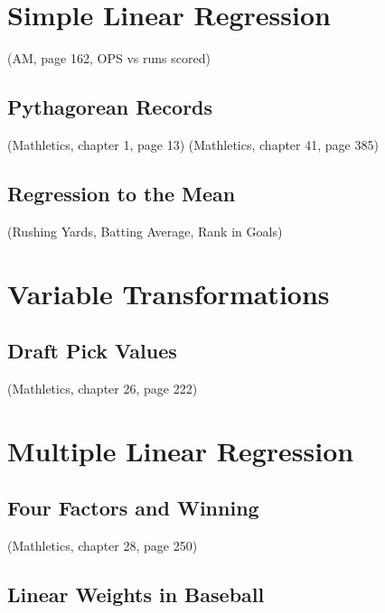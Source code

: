 \documentclass[
  11pt,
]{book}
\theoremstyle{definition}
\theoremstyle{definition}
\theoremstyle{definition}
\theoremstyle{definition}
\theoremstyle{remark}
\begin{document}
\hypertarget{simple-linear-regression}{%
\section{Simple Linear Regression}\label{simple-linear-regression}}

(AM, page 162, OPS vs runs scored)

\hypertarget{pythagorean-records}{%
\subsection{Pythagorean Records}\label{pythagorean-records}}

(Mathletics, chapter 1, page 13)
(Mathletics, chapter 41, page 385)

\hypertarget{regression-to-the-mean}{%
\subsection{Regression to the Mean}\label{regression-to-the-mean}}

(Rushing Yards, Batting Average, Rank in Goals)

\hypertarget{variable-transformations}{%
\section{Variable Transformations}\label{variable-transformations}}

\hypertarget{draft-pick-values}{%
\subsection{Draft Pick Values}\label{draft-pick-values}}

(Mathletics, chapter 26, page 222)

\hypertarget{multiple-linear-regression}{%
\section{Multiple Linear Regression}\label{multiple-linear-regression}}

\hypertarget{four-factors-and-winning}{%
\subsection{Four Factors and Winning}\label{four-factors-and-winning}}

(Mathletics, chapter 28, page 250)

\hypertarget{linear-weights-in-baseball}{%
\subsection{Linear Weights in Baseball}\label{linear-weights-in-baseball}}
\end{document}
